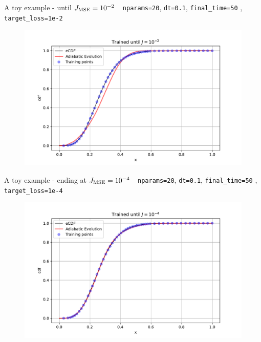 \documentclass[8pt, xcolor={svgnames}, hyperref={colorlinks, linkcolor=black, citecolor=amethyst, urlcolor=amethyst}]{beamer}
\begin{document}
\begin{frame}[fragile]{A toy example - until $J_{\rm MSE}=10^{-2}$ \hfill \faTerminal}
\faArrowCircleRight\,\, \texttt{nparams=20}, \texttt{dt=0.1}, \texttt{final\_time=50}
, \texttt{target\_loss=1e-2}
\begin{figure}
    \includegraphics[width=1\textwidth]{figures/ev2.pdf}
\end{figure}
\end{frame}

\begin{frame}[fragile]{A toy example - ending at $J_{\rm MSE}=10^{-4}$ \hfill \faTerminal}
\faArrowCircleRight\,\, \texttt{nparams=20}, \texttt{dt=0.1}, \texttt{final\_time=50}
, \texttt{target\_loss=1e-4}
\begin{figure}
    \includegraphics[width=1\textwidth]{figures/ev3.pdf}
\end{figure}
\end{frame} 
\end{document}
